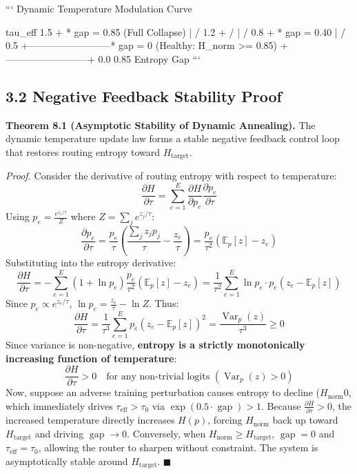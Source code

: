 \documentclass[11pt,twoside,openright]{amsbook}
\begin{document}
{{{{{{{{{{```
                         Dynamic Temperature Modulation Curve
                                         
                  tau_eff
                    1.5 +                                * gap = 0.85 (Full Collapse)
                        |                               /
                    1.2 +                              /
                        |                             /
                    0.8 +                            * gap = 0.40
                        |                           /
                    0.5 +--------------------------* gap = 0 (Healthy: H_norm >= 0.85)
                        +--------------------------+
                        0.0                       0.85
                                     Entropy Gap
```

\subsection{3.2 Negative Feedback Stability Proof}

\textbf{Theorem 8.1 (Asymptotic Stability of Dynamic Annealing).} The dynamic temperature update law forms a stable negative feedback control loop that restores routing entropy toward $H_{\text{target}}$.

\textit{Proof.}
Consider the derivative of routing entropy with respect to temperature:
$$\frac{\partial H}{\partial \tau} = \sum_{e=1}^E \frac{\partial H}{\partial p_e} \frac{\partial p_e}{\partial \tau}$$
Using $p_e = \frac{e^{z_e/\tau}}{Z}$ where $Z = \sum_j e^{z_j/\tau}$:
$$\frac{\partial p_e}{\partial \tau} = \frac{p_e}{\tau} \left( \frac{\sum_j z_j p_j}{\tau} - \frac{z_e}{\tau} \right) = \frac{p_e}{\tau^2} \left( \mathbb{E}_p[z] - z_e \right)$$
Substituting into the entropy derivative:
$$\frac{\partial H}{\partial \tau} = - \sum_{e=1}^E (1 + \ln p_e) \frac{p_e}{\tau^2} (\mathbb{E}_p[z] - z_e) = \frac{1}{\tau^2} \sum_{e=1}^E \ln p_e \cdot p_e (z_e - \mathbb{E}_p[z])$$
Since $p_e \propto e^{z_e/\tau}$, $\ln p_e = \frac{z_e}{\tau} - \ln Z$. Thus:
$$\frac{\partial H}{\partial \tau} = \frac{1}{\tau^3} \sum_{e=1}^E p_e (z_e - \mathbb{E}_p[z])^2 = \frac{\operatorname{Var}_p(z)}{\tau^3} \ge 0$$
Since variance is non-negative, \textbf{entropy is a strictly monotonically increasing function of temperature}:
$$\frac{\partial H}{\partial \tau} > 0 \quad \text{for any non-trivial logits } (\operatorname{Var}_p(z) > 0)$$
Now, suppose an adverse training perturbation causes entropy to decline ($H_{\text{norm}}  0$, which immediately drives $\tau_{\text{eff}} > \tau_0$ via $\exp(0.5 \cdot \operatorname{gap}) > 1$.
Because $\frac{\partial H}{\partial \tau} > 0$, the increased temperature directly increases $H(p)$, forcing $H_{\text{norm}}$ back up toward $H_{\text{target}}$ and driving $\operatorname{gap} \to 0$.
Conversely, when $H_{\text{norm}} \ge H_{\text{target}}$, $\operatorname{gap} = 0$ and $\tau_{\text{eff}} = \tau_0$, allowing the router to sharpen without constraint. The system is asymptotically stable around $H_{\text{target}}$. $\blacksquare$

}}}}}}}}}}
\end{document}

